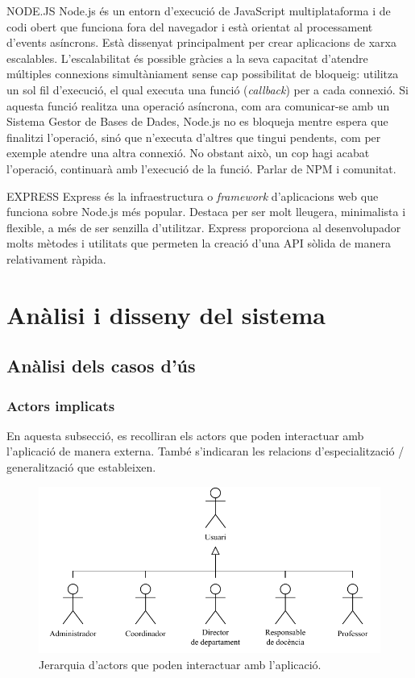 \documentclass[a4paper,12pt]{ThesisStyle}
\begin{document}
NODE.JS
Node.js és un entorn d'execució de JavaScript multiplataforma i de codi obert que funciona fora del navegador i està orientat al processament d'events asíncrons. Està dissenyat principalment per crear aplicacions de xarxa escalables. L'escalabilitat és possible gràcies a la seva capacitat d'atendre múltiples connexions simultàniament sense cap possibilitat de bloqueig: utilitza un sol fil d'execució, el qual executa una funció (\textit{callback}) per a cada connexió. Si aquesta funció realitza una operació asíncrona, com ara comunicar-se amb un Sistema Gestor de Bases de Dades, Node.js no es bloqueja mentre espera que finalitzi l'operació, sinó que n'executa d'altres que tingui pendents, com per exemple atendre una altra connexió. No obstant això, un cop hagi acabat l'operació, continuarà amb l'execució de la funció.
Parlar de NPM i comunitat.

EXPRESS
Express és la infraestructura o \textit{framework} d'aplicacions web que funciona sobre Node.js més popular. Destaca per ser molt lleugera, minimalista i flexible, a més de ser senzilla d'utilitzar. Express proporciona al desenvolupador molts mètodes i utilitats que permeten la creació d'una API sòlida de manera relativament ràpida. 

\chapter{Anàlisi i disseny del sistema}
\label{cap:analisi}

\section{Anàlisi dels casos d'ús}
\label{sec:casos_us}

\subsection{Actors implicats}
\label{subsec:casos_us_actors}

En aquesta subsecció, es recolliran els actors que poden interactuar amb l'aplicació de manera externa. També s'indicaran les relacions d'especialització / generalització que estableixen.

\begin{figure}[H]
  \centering
  \includegraphics[width=\textwidth]{assets/use_cases/actors.pdf}
  \caption{\label{img:casos_us_actors}Jerarquia d'actors que poden interactuar amb l'aplicació.}
\end{figure}
\end{document}
